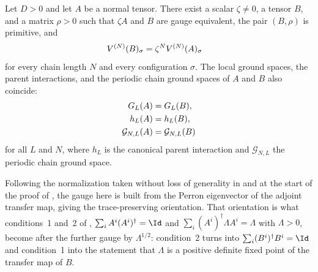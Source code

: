 \begin{lemma}
    \label{thm:normalized_primitive_gauge}
    \leanok
    Let $D>0$ and let $A$ be a normal tensor.  There exist a scalar
    $\zeta\neq0$, a tensor $B$, and a matrix $\rho>0$ such that $\zeta A$ and
    $B$ are gauge equivalent, the pair $(B,\rho)$ is primitive, and
    \begin{align}
        V^{(N)}(B)_{\sigma}
         & =\zeta^{N}V^{(N)}(A)_{\sigma} \notag
    \end{align}
    for every chain length $N$ and every configuration $\sigma$.  The local
    ground spaces, the parent interactions, and the periodic chain ground
    spaces of $A$ and $B$ also coincide:
    \begin{align}
        G_L(A)              & =G_L(B), \notag             \\
        h_L(A)              & =h_L(B), \notag             \\
        \mathcal G_{N,L}(A) & =\mathcal G_{N,L}(B) \notag
    \end{align}
    for all $L$ and $N$, where $h_L$ is the canonical parent interaction and
    $\mathcal G_{N,L}$ the periodic chain ground space.

    Following the normalization taken without loss of generality in
    \cite[equations~(3.1)--(3.2b), lines~1394--1435]{Nachtergaele1996Spectral}
    and at the start of the proof of
    \cite[Theorem~4, lines~765--770]{PerezGarcia2007Matrix}, the gauge here is
    built from the Perron eigenvector of the adjoint transfer map, giving the
    trace-preserving orientation.  That orientation is what conditions~1 and~2
    of \cite[Theorem~4, lines~752--758]{PerezGarcia2007Matrix},
    $\sum_iA^i(A^i)^\dagger=\Id$ and $\sum_i(A^i)^\dagger\Lambda A^i=\Lambda$
    with $\Lambda>0$, become after the further gauge by $\Lambda^{1/2}$:
    condition~2 turns into $\sum_i(B^i)^\dagger B^i=\Id$ and condition~1 into
    the statement that $\Lambda$ is a positive definite fixed point of the
    transfer map of $B$.
\end{lemma}

